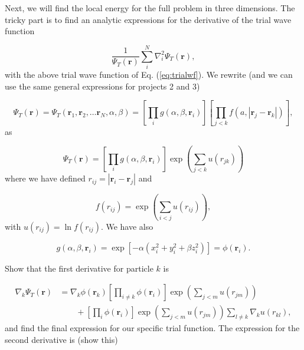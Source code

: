 \documentclass[%
oneside,                 %
final,                   %
10pt]{article}
\begin{document}
Next, we will find the local energy for the full problem in three dimensions.
The tricky part is to find an analytic expressions for the derivative of the trial wave function

\begin{equation*}
   \frac{1}{\Psi_T(\mathbf{r})}\sum_i^{N}\nabla_i^2\Psi_T(\mathbf{r}),
\end{equation*}
with the above 
trial wave function of Eq. (\ref{eq:trialwf}).
We rewrite (and we can use the same general expressions for projects 2 and 3)

\begin{equation*}
\Psi_T(\mathbf{r})=\Psi_T(\mathbf{r}_1, \mathbf{r}_2, \dots \mathbf{r}_N,\alpha,\beta)
=\left[
    \prod_i g(\alpha,\beta,\mathbf{r}_i)
\right]
\left[
    \prod_{j<k}f(a,|\mathbf{r}_j-\mathbf{r}_k|)
\right],
\end{equation*}
as

\begin{equation*}
\Psi_T(\mathbf{r})=\left[
    \prod_i g(\alpha,\beta,\mathbf{r}_i)
\right]
\exp{\left(\sum_{j<k}u(r_{jk})\right)}
\end{equation*}
where we have defined $r_{ij}=|\mathbf{r}_i-\mathbf{r}_j|$
and

\begin{equation*}
   f(r_{ij})= \exp{\left(\sum_{i<j}u(r_{ij})\right)},
\end{equation*}
with $u(r_{ij})=\ln{f(r_{ij})}$.
We have also

\begin{equation*}
    g(\alpha,\beta,\mathbf{r}_i) = \exp{\left[-\alpha(x_i^2+y_i^2+\beta
    z_i^2)\right]}= \phi(\mathbf{r}_i).
\end{equation*}

Show that the first  derivative for particle $k$ is

\begin{align*}
  \nabla_k\Psi_T(\mathbf{r}) &= \nabla_k\phi(\mathbf{r}_k)\left[\prod_{i\ne k}\phi(\mathbf{r}_i)\right]\exp{\left(\sum_{j<m}u(r_{jm})\right)}
  \\
  &\qquad
  +  \left[\prod_i\phi(\mathbf{r}_i)\right]
  \exp{\left(\sum_{j<m}u(r_{jm})\right)}\sum_{l\ne k}\nabla_k u(r_{kl}),
\end{align*}
and find the final expression for our specific trial function.
The expression for the second derivative is (show this)
\end{document}
